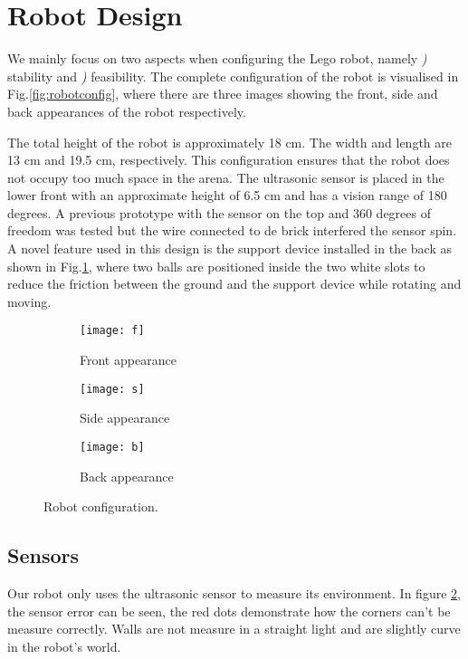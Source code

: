\section{Robot Design}
We mainly focus on two aspects when configuring the Lego robot, namely {\itshape {})} stability and {\itshape {})} feasibility. The complete configuration of the robot is visualised in Fig.\ref{fig:robotconfig}, where there are three images showing the front, side and back appearances of the robot respectively. 

The total height of the robot is approximately 18 cm. The width and length are 13 cm and 19.5 cm, respectively. This configuration ensures that the robot does not occupy too much space in the arena. The ultrasonic sensor is placed in the lower front with an approximate height of 6.5 cm and has a vision range of 180 degrees. A previous prototype with the sensor on the top and 360 degrees of freedom was tested but the wire connected to de brick interfered the sensor spin. A novel feature used in this design is the support device installed in the back as shown in Fig.\ref{fig:backrobot}, where two balls are positioned inside the two white slots to reduce the friction between the ground and the support device while rotating and moving. 

\begin{figure}[h]
\centering
  \begin{subfigure}{0.25\textwidth}
  \texttt{[image: f]}
  \caption{Front appearance}
  \end{subfigure}
  \begin{subfigure}{0.25\textwidth}
  \texttt{[image: s]}
  \caption{Side appearance}
  \end{subfigure}
  \begin{subfigure}{0.25\textwidth}
  \texttt{[image: b]}
  \caption{Back appearance} \label{fig:backrobot}
  \end{subfigure}
  \caption{Robot configuration.}
  \label{fig:sensorerrors}
\end{figure}

\subsection{Sensors}

Our robot only uses the ultrasonic sensor to measure its environment. In figure \ref{fig:sensorerrors}, the sensor error can be seen, the red dots demonstrate how the corners can't be measure correctly. Walls are not measure in a straight light and are slightly curve in the robot's world.

